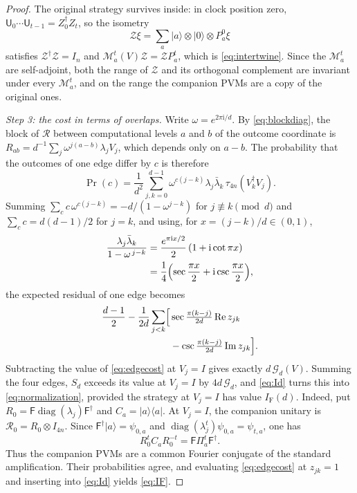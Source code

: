 \documentclass[aps,prl,reprint,superscriptaddress,longbibliography,floatfix,raggedbottom]{revtex4-2}
\newcommand{\ii}{\mathrm i}
\newcommand{\ket}[1]{\lvert #1\rangle}
\newcommand{\bra}[1]{\langle #1\rvert}
\DeclareMathOperator{\diag}{diag}
\DeclareMathOperator{\Prob}{Pr}
\newcommand{\tr}{\tau}
\newcommand{\IF}{I_{\mathrm F}}
\newcommand{\Gd}{\mathcal G_d}
\newcommand{\Zisom}{\mathcal Z}
\newcommand{\RootP}{\mathcal M}
\begin{document}
\begin{proof}
The original strategy survives inside: in clock position zero,
$\mathsf U_0\cdots\mathsf U_{t-1}=Z_0^\dagger Z_t$, so the isometry
\begin{equation}\label{eq:reducingisometry}
\Zisom\xi=\sum_a\ket a\otimes\ket0\otimes P^0_a\xi
\end{equation}
satisfies $\Zisom^\dagger\Zisom=I_n$ and
$\RootP^t_a(V)\Zisom=\Zisom P^t_a$, which is \eqref{eq:intertwine}.
Since the $\RootP^t_a$ are self-adjoint, both the range of $\Zisom$ and
its orthogonal complement are invariant under every $\RootP^t_a$, and
on the range the companion PVMs are a copy of the original ones.

\emph{Step 3: the cost in terms of overlaps.}
Write $\omega=e^{2\pi\ii/d}$. By \eqref{eq:blockdiag}, the block of
$\mathcal R$ between computational levels $a$ and $b$ of the outcome
coordinate is $R_{ab}=d^{-1}\sum_j\omega^{j(a-b)}\lambda_jV_j$, which
depends only on $a-b$. The probability that the outcomes of one edge
differ by $c$ is therefore
\[
\Prob(c)=\frac1{d^2}\sum_{j,k=0}^{d-1}\omega^{c(j-k)}
\lambda_j\bar\lambda_k\,\tr_{4n}(V_k^\dagger V_j).
\]
Summing $\sum_c c\,\omega^{c(j-k)}=-d/(1-\omega^{j-k})$ for
$j\not\equiv k\pmod d$ and $\sum_c c=d(d-1)/2$ for $j=k$, and using,
for $x=\mbox{$(j-k)/d\in(0,1)$}$,
\begin{equation*}
\begin{split}
\frac{\lambda_j\bar\lambda_k}{1-\omega^{\,j-k}}
&=\frac{e^{\pi\ii x/2}}2\,(1+\ii\cot\pi x)\\
&=\frac14\Bigl(\sec\frac{\pi x}2+\ii\csc\frac{\pi x}2\Bigr),
\end{split}
\end{equation*}
the expected residual of one edge becomes
\begin{equation}\label{eq:edgecost}
\begin{split}
\frac{d-1}2-\frac1{2d}\sum_{j<k}\Bigl[
&\sec\tfrac{\pi(k-j)}{2d}\operatorname{Re}z_{jk}\\
&-\csc\tfrac{\pi(k-j)}{2d}\operatorname{Im}z_{jk}\Bigr].
\end{split}
\end{equation}
Subtracting the value of \eqref{eq:edgecost} at $V_j=I$ gives exactly
$d\,\Gd(V)$. Summing the four edges, $S_d$ exceeds its value at $V_j=I$
by $4d\,\Gd$, and \eqref{eq:Id} turns this into \eqref{eq:normalization},
provided the strategy at $V_j=I$ has value $\IF(d)$.
Indeed, put $R_0=\mathsf F\diag(\lambda_j)\mathsf F^\dagger$ and
$C_a=\ket a\bra a$. At $V_j=I$, the companion unitary is
$\mathcal R_0=R_0\otimes I_{4n}$. Since
$\mathsf F^\dagger\ket a=\psi_{0,a}$ and
$\diag(\lambda_j^t)\psi_{0,a}=\psi_{t,a}$, one has
\begin{equation}\label{eq:fourierconjugation}
R_0^t C_a R_0^{-t}=\mathsf F\Pi^t_a\mathsf F^\dagger.
\end{equation}
Thus the companion PVMs are a common Fourier conjugate of the standard
amplification. Their probabilities agree, and evaluating
\eqref{eq:edgecost} at $z_{jk}=1$ and inserting into \eqref{eq:Id}
yields \eqref{eq:IF}.
\end{proof}
\end{document}
